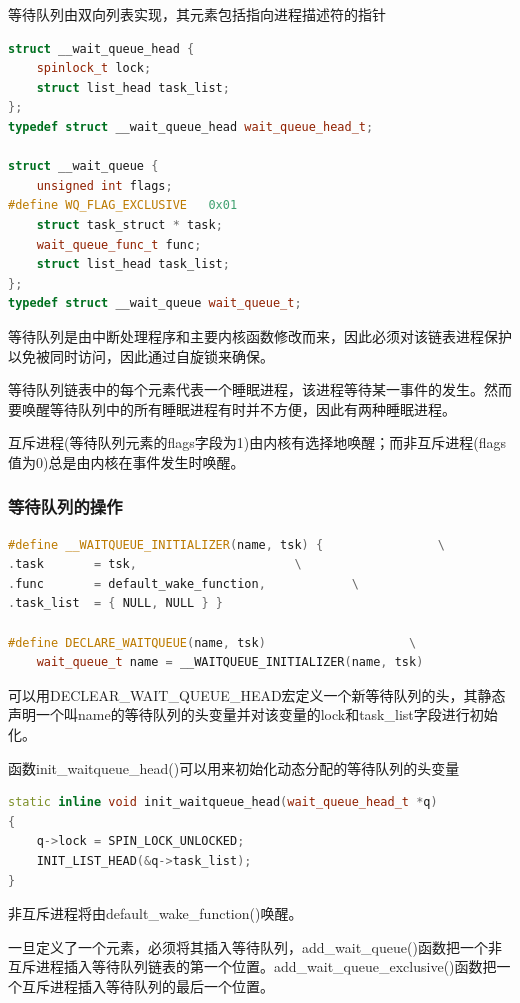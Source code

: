     等待队列由双向列表实现，其元素包括指向进程描述符的指针

\begin{lstlisting}[language=C++]
struct __wait_queue_head {
    spinlock_t lock;
    struct list_head task_list;
};
typedef struct __wait_queue_head wait_queue_head_t;

struct __wait_queue {
	unsigned int flags;
#define WQ_FLAG_EXCLUSIVE	0x01
	struct task_struct * task;
	wait_queue_func_t func;
	struct list_head task_list;
};
typedef struct __wait_queue wait_queue_t;
\end{lstlisting}

    等待队列是由中断处理程序和主要内核函数修改而来，因此必须对该链表进程保护以免被同时访问，因此通过自旋锁来确保。

    等待队列链表中的每个元素代表一个睡眠进程，该进程等待某一事件的发生。然而要唤醒等待队列中的所有睡眠进程有时并不方便，因此有两种睡眠进程。

    互斥进程(等待队列元素的flags字段为1)由内核有选择地唤醒；而非互斥进程(flags值为0)总是由内核在事件发生时唤醒。

\subsubsection{等待队列的操作}

\begin{lstlisting}[language=C++]
#define __WAITQUEUE_INITIALIZER(name, tsk) {				\
.task		= tsk,						\
.func		= default_wake_function,			\
.task_list	= { NULL, NULL } }

#define DECLARE_WAITQUEUE(name, tsk)					\
	wait_queue_t name = __WAITQUEUE_INITIALIZER(name, tsk)
\end{lstlisting}

    可以用DECLEAR\_WAIT\_QUEUE\_HEAD宏定义一个新等待队列的头，其静态声明一个叫name的等待队列的头变量并对该变量的lock和task\_list字段进行初始化。

    函数init\_waitqueue\_head()可以用来初始化动态分配的等待队列的头变量

\begin{lstlisting}[language=C++]
static inline void init_waitqueue_head(wait_queue_head_t *q)
{
    q->lock = SPIN_LOCK_UNLOCKED;
    INIT_LIST_HEAD(&q->task_list);
}
\end{lstlisting}

    非互斥进程将由default\_wake\_function()唤醒。

    一旦定义了一个元素，必须将其插入等待队列，add\_wait\_queue()函数把一个非互斥进程插入等待队列链表的第一个位置。add\_wait\_queue\_exclusive()函数把一个互斥进程插入等待队列的最后一个位置。

